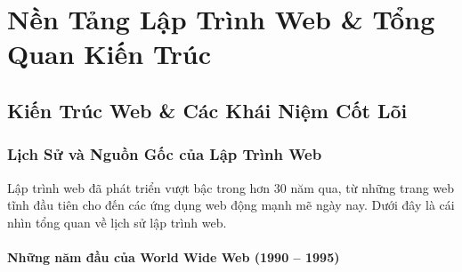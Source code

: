 \documentclass[11pt,oneside]{book}
\begin{document}
\frontmatter
\renewcommand{\contentsname}{MỤC LỤC TÀI LIỆU HTML5}
\setcounter{tocdepth}{2}

\tableofcontents
\clearpage

\mainmatter

\part{Nền Tảng Lập Trình Web \& Tổng Quan Kiến Trúc}


\chapter{Kiến Trúc Web \& Các Khái Niệm Cốt Lõi}
\label{chap:web_architecture}

\section{Lịch Sử và Nguồn Gốc của Lập Trình Web}
\label{sec:web_history}

Lập trình web đã phát triển vượt bậc trong hơn 30 năm qua, từ những trang web tĩnh đầu tiên cho đến các ứng dụng web động mạnh mẽ ngày nay. Dưới đây là cái nhìn tổng quan về lịch sử lập trình web.

\subsection{Những năm đầu của World Wide Web (1990 -- 1995)}
\end{document}
